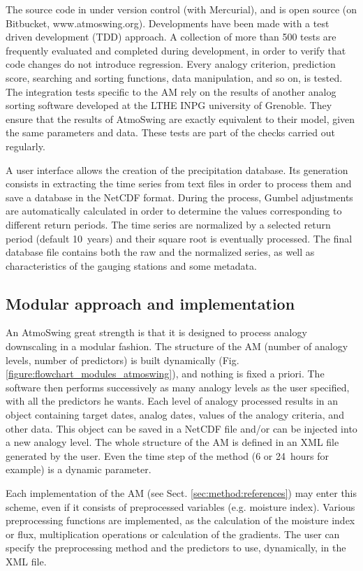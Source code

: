 \documentclass[review]{elsarticle}
\begin{document}
The source code in under version control (with Mercurial), and is open source (on Bitbucket, www.atmoswing.org). Developments have been made with a test driven development (TDD) approach. A collection of more than 500 tests are frequently evaluated and completed during development, in order to verify that code changes do not introduce regression. Every analogy criterion, prediction score, searching and sorting functions, data manipulation, and so on, is tested. The integration tests specific to the AM rely on the results of another analog sorting software developed at the LTHE \textendash INPG university of Grenoble. They ensure that the results of AtmoSwing are exactly equivalent to their model, given the same parameters and data. These tests are part of the checks carried out regularly.

A user interface allows the creation of the precipitation database. Its generation consists in extracting the time series from text files in order to process them and save a database in the NetCDF format. During the process, Gumbel adjustments are automatically calculated in order to determine the values corresponding to different return periods. The time series are normalized by a selected return period (default 10~years) and their square root is eventually processed. The final database file contains both the raw and the normalized series, as well as characteristics of the gauging stations and some metadata.


\subsection{Modular approach and implementation}

An AtmoSwing great strength is that it is designed to process analogy downscaling in a modular fashion. The structure of the AM (number of analogy levels, number of predictors) is built dynamically (Fig. \ref{figure:flowchart_modules_atmoswing}), and nothing is fixed a priori. The software then performs successively as many analogy levels as the user specified, with all the predictors he wants. Each level of analogy processed results in an object containing target dates, analog dates, values of the analogy criteria, and other data. This object can be saved in a NetCDF file and/or can be injected into a new analogy level. The whole structure of the AM is defined in an XML file generated by the user. Even the time step of the method (6 or 24~hours for example) is a dynamic parameter.

Each implementation of the AM (see Sect. \ref{sec:method:references}) may enter this scheme, even if it consists of preprocessed variables (e.g. moisture index). Various preprocessing functions are implemented, as the calculation of the moisture index or flux, multiplication operations or calculation of the gradients. The user can specify the preprocessing method and the predictors to use, dynamically, in the XML file.
\end{document}
